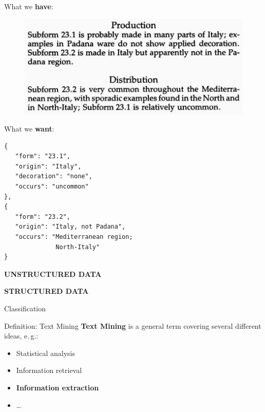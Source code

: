 \documentclass[xcolor=x11names, aspectratio=169,usenames,dvipsnames]{beamer}
\begin{document}
\begin{frame}[fragile]{}
\begin{minipage}[t]{0.45\textwidth}
What we \textbf{have}:\medskip

\begin{figure}
\includegraphics[width=1.0\textwidth]{img/consp_ex.jpg}
\end{figure}
\end{minipage}\hfill\pause
\begin{minipage}[t]{0.45\textwidth}
What we \textbf{want}:\medskip
{\scriptsize
\begin{verbatim}
{
   "form": "23.1",
   "origin": "Italy",
   "decoration": "none",
   "occurs": "uncommon"
},
{
   "form": "23.2",
   "origin": "Italy, not Padana",
   "occurs": "Mediterranean region;
              North-Italy"
}
\end{verbatim}
}
\end{minipage}\pause\medskip

\begin{minipage}[t]{0.45\textwidth}
\begin{center}
\alert{\textbf{UNSTRUCTURED DATA}}
\end{center}
\end{minipage}\hfill
\begin{minipage}[t]{0.45\textwidth}
\begin{center}
\alert{\textbf{STRUCTURED DATA}}
\end{center}
\end{minipage}
\end{frame}

\begin{frame}{Classification}
\begin{block}{Definition: Text Mining}\vspace{.5em}
\textbf{Text Mining} is a \alert{general term} covering several different ideas\pause, e.\,g.:
\begin{itemize}[<+->]
\item Statistical analysis
\item Information retrieval
\item \textbf{Information extraction}
\item\dots
\end{itemize}
\end{block}
\end{frame}
\end{document}
